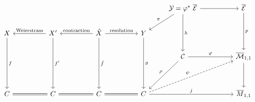 \documentclass[a4paper,12pt]{amsart}
\theoremstyle{definition}
\begin{document}
	\begin{equation*}\label{diag:Master}
		\begin{tikzcd}
			&  &                                                                          &  &                                                                                                      &  &                                                  & {\mathcal{Y} = \varphi^* ~ \overline{\mathcal{E}}} \arrow[rr] \arrow[dd, "h"] \arrow[ld, "\pi"'] &  & {\overline{\mathcal{E}}} \arrow[dd, "p"] \\
			X \arrow[ddd, "f"]                &  & X^{\prime} \arrow[ddd, "f^{\prime}"] \arrow[ll, "\mathrm{Weierstrass}"'] &  & \hat{X} \arrow[rr, "\mathrm{resolution}"] \arrow[ddd, "\hat{f}"] \arrow[ll, "\mathrm{contraction}"'] &  & Y \arrow[ddd, "g"]                               &                                                                                                        &  &                                                \\
			&  &                                                                          &  &                                                                                                      &  &                                                  & \mathcal{C} \arrow[rr, "\varphi"] \arrow[ldd, "\rho"']                                                 &  & {\overline{\mathcal{M}}_{1,1}} \arrow[dd]      \\
			&  &                                                                          &  &                                                                                                      &  &                                                  &                                                                                                        &  &                                                \\
			C \arrow[rr, Rightarrow, no head] &  & C \arrow[rr, Rightarrow, no head]                                        &  & C \arrow[rr, Rightarrow, no head]                                                                    &  & C \arrow[rrr, "j"] \arrow[rrruu, "\psi", dashed] &                                                                                                        &  & {\overline{M}_{1,1}}                          
		\end{tikzcd}
	\end{equation*}
	
\end{document}
